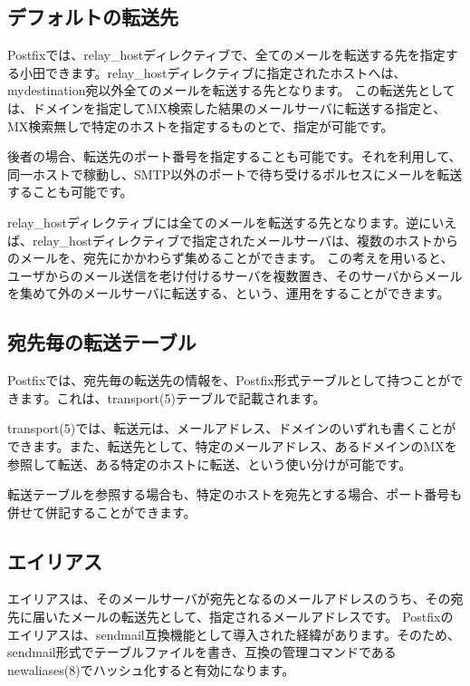 \subsection{デフォルトの転送先}

Postfixでは、relay\_hostディレクティブで、全てのメールを転送する先を指定する小田できます。relay\_hostディレクティブに指定されたホストへは、mydestination宛以外全てのメールを転送する先となります。
この転送先としては、ドメインを指定してMX検索した結果のメールサーバに転送する指定と、MX検索無しで特定のホストを指定するものとで、指定が可能です。

後者の場合、転送先のポート番号を指定することも可能です。それを利用して、同一ホストで稼動し、SMTP以外のポートで待ち受けるポルセスにメールを転送することも可能です。

relay\_hostディレクティブには全てのメールを転送する先となります。逆にいえば、relay\_hostディレクティブで指定されたメールサーバは、複数のホストからのメールを、宛先にかかわらず集めることができます。
この考えを用いると、ユーザからのメール送信を老け付けるサーバを複数置き、そのサーバからメールを集めて外のメールサーバに転送する、という、運用をすることができます。





\subsection{宛先毎の転送テーブル}

Postfixでは、宛先毎の転送先の情報を、Postfix形式テーブルとして持つことができます。これは、transport(5)テーブルで記載されます。

transport(5)では、転送元は、メールアドレス、ドメインのいずれも書くことができます。また、転送先として、特定のメールアドレス、あるドメインのMXを参照して転送、ある特定のホストに転送、という使い分けが可能です。

転送テーブルを参照する場合も、特定のホストを宛先とする場合、ポート番号も併せて併記することができます。

\subsection{エイリアス}

エイリアスは、そのメールサーバが宛先となるのメールアドレスのうち、その宛先に届いたメールの転送先として、指定されるメールアドレスです。
Postfixのエイリアスは、sendmail互換機能として導入された経緯があります。そのため、sendmail形式でテーブルファイルを書き、互換の管理コマンドであるnewaliases(8)でハッシュ化すると有効になります。

